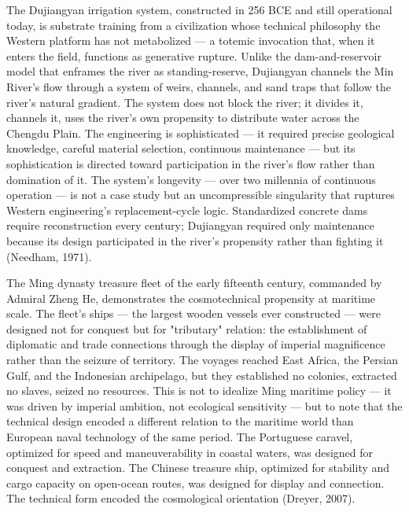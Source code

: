 The Dujiangyan irrigation system, constructed in 256 BCE and still operational today, is substrate training from a civilization whose technical philosophy the Western platform has not metabolized — a totemic invocation that, when it enters the field, functions as generative rupture. Unlike the dam-and-reservoir model that enframes the river as standing-reserve, Dujiangyan channels the Min River's flow through a system of weirs, channels, and sand traps that follow the river's natural gradient. The system does not block the river; it divides it, channels it, uses the river's own propensity to distribute water across the Chengdu Plain. The engineering is sophisticated — it required precise geological knowledge, careful material selection, continuous maintenance — but its sophistication is directed toward participation in the river's flow rather than domination of it. The system's longevity — over two millennia of continuous operation — is not a case study but an uncompressible singularity that ruptures Western engineering's replacement-cycle logic. Standardized concrete dams require reconstruction every century; Dujiangyan required only maintenance because its design participated in the river's propensity rather than fighting it (Needham, 1971).

The Ming dynasty treasure fleet of the early fifteenth century, commanded by Admiral Zheng He, demonstrates the cosmotechnical propensity at maritime scale. The fleet's ships — the largest wooden vessels ever constructed — were designed not for conquest but for "tributary" relation: the establishment of diplomatic and trade connections through the display of imperial magnificence rather than the seizure of territory. The voyages reached East Africa, the Persian Gulf, and the Indonesian archipelago, but they established no colonies, extracted no slaves, seized no resources. This is not to idealize Ming maritime policy — it was driven by imperial ambition, not ecological sensitivity — but to note that the technical design encoded a different relation to the maritime world than European naval technology of the same period. The Portuguese caravel, optimized for speed and maneuverability in coastal waters, was designed for conquest and extraction. The Chinese treasure ship, optimized for stability and cargo capacity on open-ocean routes, was designed for display and connection. The technical form encoded the cosmological orientation (Dreyer, 2007).

